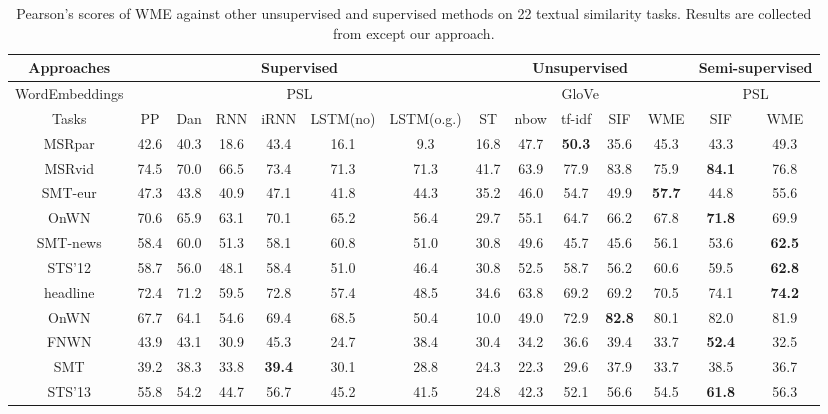 \documentclass[11pt,a4paper]{article}
\newcommand{\1}{\boldsymbol{1}}
\begin{document}
\begin{table}[htb]
\centering
\scriptsize
\caption{Pearson's scores of WME against other unsupervised and supervised methods on 22 textual similarity tasks. Results are collected from \cite{arora2017simple} except our approach.}
\vspace{0mm}
\label{tb:comp_textual_similarity_full}
\newcommand{\Bd}[1]{\textbf{#1}}
\begin{center}
    \begin{tabular}{ c | cccccc | ccccc | cc}
    \hline
    \multicolumn{1}{c}{Approaches}  
    & \multicolumn{6}{c}{Supervised} 
    & \multicolumn{5}{c}{Unsupervised}
    & \multicolumn{2}{c}{Semi-supervised}\\ \hline 
    \multicolumn{1}{c}{WordEmbeddings}  
    & \multicolumn{6}{c}{PSL} 
    & \multicolumn{5}{c}{GloVe}
    & \multicolumn{2}{c}{PSL}\\ \hline 
    Tasks & PP & Dan & RNN & iRNN & LSTM(no) & LSTM(o.g.) & ST & nbow & tf-idf & SIF & WME & SIF & WME \\ \hline 
    MSRpar & 42.6 & 40.3 & 18.6 & 43.4 & 16.1 & 9.3 & 16.8 & 47.7 & \Bd{50.3} & 35.6 & 45.3 & 43.3 & 49.3 \\
    MSRvid & 74.5 & 70.0 & 66.5 & 73.4 & 71.3 & 71.3 & 41.7 & 63.9 & 77.9 & 83.8 & 75.9 & \Bd{84.1} & 76.8 \\
    SMT-eur & 47.3 & 43.8 & 40.9 & 47.1 & 41.8 & 44.3 & 35.2 & 46.0 & 54.7 & 49.9 & \Bd{57.7} & 44.8 & 55.6\\
    OnWN & 70.6 & 65.9 & 63.1 & 70.1 & 65.2 & 56.4 & 29.7 & 55.1 & 64.7 & 66.2 & 67.8 & \Bd{71.8} & 69.9\\
    SMT-news & 58.4 & 60.0 & 51.3 & 58.1 & 60.8 & 51.0 & 30.8 & 49.6 & 45.7 & 45.6 & 56.1 & 53.6 & \Bd{62.5} \\
    STS'12 & 58.7 & 56.0 & 48.1 & 58.4 & 51.0 & 46.4 & 30.8 & 52.5 & 58.7 & 56.2 & 60.6 & 59.5 & \Bd{62.8}\\ \hline
    headline & 72.4 & 71.2 & 59.5 & 72.8 & 57.4 & 48.5 & 34.6 & 63.8 & 69.2 & 69.2 & 70.5 & 74.1 & \Bd{74.2}\\
    OnWN & 67.7 & 64.1 & 54.6 & 69.4 & 68.5 & 50.4 & 10.0 & 49.0 & 72.9 & \Bd{82.8} & 80.1 & 82.0 & 81.9\\
    FNWN & 43.9 & 43.1 & 30.9 & 45.3 & 24.7 & 38.4 & 30.4 & 34.2 & 36.6 & 39.4 & 33.7 & \Bd{52.4} & 32.5\\
    SMT & 39.2 & 38.3 & 33.8 & \Bd{39.4} & 30.1 & 28.8 & 24.3 & 22.3 & 29.6 & 37.9 & 33.7 & 38.5 & 36.7\\
    STS'13 & 55.8 & 54.2 & 44.7 & 56.7 & 45.2 & 41.5 & 24.8 & 42.3 & 52.1 & 56.6 & 54.5 & \Bd{61.8} & 56.3 \\ \hline

\end{tabular}
\end{center}
\end{table}
\end{document}
